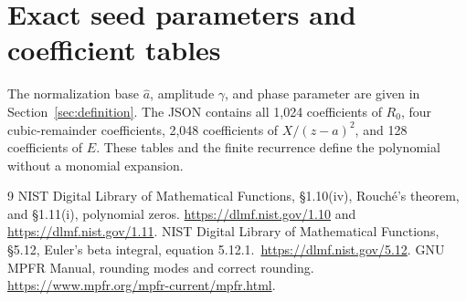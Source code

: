 \documentclass[11pt,a4paper]{article}
\newcommand{\astar}{\widehat a}
\begin{document}
\appendix
\section{Exact seed parameters and coefficient tables}

The normalization base $\astar$, amplitude $\gamma$, and phase parameter are
given in Section~\ref{sec:definition}. The JSON contains all 1,024 coefficients
of $R_0$, four cubic-remainder coefficients, 2,048 coefficients of
$X/(z-a)^2$, and 128 coefficients of $E$. These tables and the finite
recurrence define the polynomial without a monomial expansion.

\begin{thebibliography}{9}
 NIST Digital Library of Mathematical Functions,
\S1.10(iv), Rouch\'e's theorem, and \S1.11(i), polynomial zeros.
\url{https://dlmf.nist.gov/1.10} and \url{https://dlmf.nist.gov/1.11}.
 NIST Digital Library of Mathematical Functions,
\S5.12, Euler's beta integral, equation 5.12.1.\ \url{https://dlmf.nist.gov/5.12}.
 GNU MPFR Manual, rounding modes and correct rounding.
\url{https://www.mpfr.org/mpfr-current/mpfr.html}.
\end{thebibliography}
\end{document}
